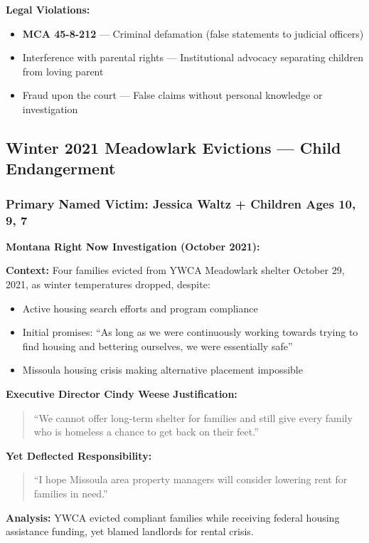 \documentclass[11pt,letterpaper]{article}
\newcommand{\statref}[1]{\textbf{\color{NavyBlue}#1}}
\begin{document}
\textbf{Legal Violations:}
\begin{itemize}[leftmargin=*]
\item \statref{MCA 45-8-212} --- Criminal defamation (false statements to judicial officers)
\item Interference with parental rights --- Institutional advocacy separating children from loving parent
\item Fraud upon the court --- False claims without personal knowledge or investigation
\end{itemize}

\subsection{Winter 2021 Meadowlark Evictions --- Child Endangerment}

\subsubsection{Primary Named Victim: Jessica Waltz + Children Ages 10, 9, 7}

\textbf{Montana Right Now Investigation (October 2021):}

\textbf{Context:} Four families evicted from YWCA Meadowlark shelter October 29, 2021, as winter temperatures dropped, despite:
\begin{itemize}[leftmargin=*]
\item Active housing search efforts and program compliance
\item Initial promises: ``As long as we were continuously working towards trying to find housing and bettering ourselves, we were essentially safe''
\item Missoula housing crisis making alternative placement impossible
\end{itemize}

\textbf{Executive Director Cindy Weese Justification:}
\begin{quote}
``We cannot offer long-term shelter for families and still give every family who is homeless a chance to get back on their feet.''
\end{quote}

\textbf{Yet Deflected Responsibility:}
\begin{quote}
``I hope Missoula area property managers will consider lowering rent for families in need.''
\end{quote}

\textbf{Analysis:} YWCA evicted compliant families while receiving federal housing assistance funding, yet blamed landlords for rental crisis.
\end{document}

